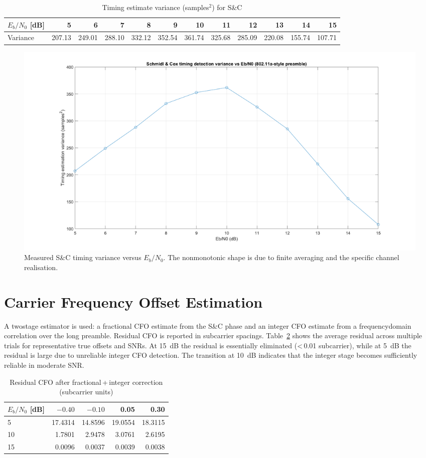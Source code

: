 \documentclass[journal,onecolumn]{IEEEtran}
\begin{document}
\begin{table}[H]
\centering
\caption{Timing estimate variance (samples$^2$) for S\&C}
\label{tab:timingvar}
\begin{tabular}{lrrrrrrrrrrr}
\toprule
$E_b/N_0$ [dB] & 5 & 6 & 7 & 8 & 9 & 10 & 11 & 12 & 13 & 14 & 15 \\
\midrule
Variance & 207.13 & 249.01 & 288.10 & 332.12 & 352.54 & 361.74 & 325.68 & 285.09 & 220.08 & 155.74 & 107.71 \\
\bottomrule
\end{tabular}
\end{table}

\begin{figure}[!t]
\centering
\includegraphics[width=\linewidth]{4.png}
\caption{Measured S\&C timing variance versus $E_b/N_0$. The non\textendash monotonic shape is due to finite averaging and the specific channel realisation.}
\label{fig:timingvar}
\end{figure}

\section{Carrier Frequency Offset Estimation}
A two\textendash stage estimator is used: a fractional CFO estimate from the S\&C phase and an integer CFO estimate from a frequency\textendash domain correlation over the long preamble. Residual CFO is reported in subcarrier spacings. Table~\ref{tab:cfo} shows the average residual across multiple trials for representative true offsets and SNRs. At \SI{15}{dB} the residual is essentially eliminated (\textless\,\num{0.01} subcarrier), while at \SI{5}{dB} the residual is large due to unreliable integer CFO detection. The transition at \SI{10}{dB} indicates that the integer stage becomes sufficiently reliable in moderate SNR.

\begin{table}[H]
\centering
\caption{Residual CFO after fractional\,+\,integer correction (subcarrier units)}
\label{tab:cfo}
\begin{tabular}{lrrrr}
\toprule
$E_b/N_0$ [dB] & \(-0.40\) & \(-0.10\) & 0.05 & 0.30 \\
\midrule
5 & 17.4314 & 14.8596 & 19.0554 & 18.3115 \\
10 & 1.7801 & 2.9478 & 3.0761 & 2.6195 \\
15 & 0.0096 & 0.0037 & 0.0039 & 0.0038 \\
\bottomrule
\end{tabular}
\end{table}
\end{document}
